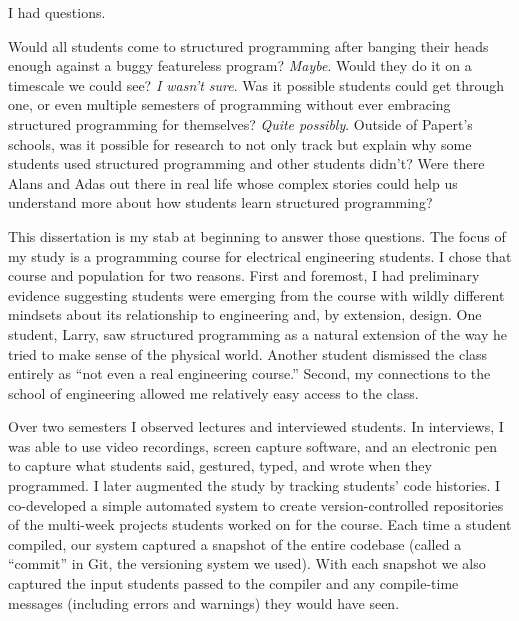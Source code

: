 I had questions.

Would all students come to structured programming after banging their
heads enough against a buggy featureless program? \emph{Maybe}. Would
they do it on a timescale we could see? \emph{I wasn't sure}. Was it
possible students could get through one, or even multiple semesters of
programming without ever embracing structured programming for
themselves? \emph{Quite possibly}. Outside of Papert's schools, was it
possible for research to not only track but explain why some students
used structured programming and other students didn't? Were there Alans
and Adas out there in real life whose complex stories could help us
understand more about how students learn structured programming?

This dissertation is my stab at beginning to answer those questions. The
focus of my study is a programming course for electrical engineering
students. I chose that course and population for two reasons. First and
foremost, I had preliminary evidence suggesting students were emerging
from the course with wildly different mindsets about its relationship to
engineering and, by extension, design. One student, Larry, saw
structured programming as a natural extension of the way he tried to
make sense of the physical world. Another student dismissed the class
entirely as ``not even a real engineering course.'' Second, my
connections to the school of engineering allowed me relatively easy
access to the class.

Over two semesters I observed lectures and interviewed students. In
interviews, I was able to use video recordings, screen capture software,
and an electronic pen to capture what students said, gestured, typed,
and wrote when they programmed. I later augmented the study by tracking
students' code histories. I co-developed a simple automated system to
create version-controlled repositories of the multi-week projects
students worked on for the course. Each time a student compiled, our
system captured a snapshot of the entire codebase (called a ``commit''
in Git, the versioning system we used). With each snapshot we also
captured the input students passed to the compiler and any compile-time
messages (including errors and warnings) they would have seen.


